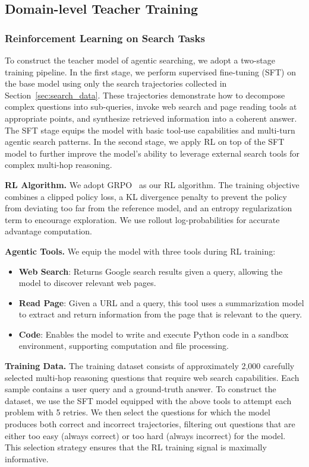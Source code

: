 \documentclass{llmxive}
\begin{document}
\subsection{Domain-level Teacher Training}
\label{sec:domain-level}

\subsubsection{Reinforcement Learning on Search Tasks}
To construct the teacher model of agentic searching, we adopt a two-stage training pipeline. In the first stage, we perform supervised fine-tuning (SFT) on the base model using only the search trajectories collected in Section~\ref{sec:search_data}. These trajectories demonstrate how to decompose complex questions into sub-queries, invoke web search and page reading tools at appropriate points, and synthesize retrieved information into a coherent answer. The SFT stage equips the model with basic tool-use capabilities and multi-turn agentic search patterns. In the second stage, we apply RL on top of the SFT model to further improve the model's ability to leverage external search tools for complex multi-hop reasoning.

\textbf{RL Algorithm.} We adopt GRPO~\citep{shao2024deepseekmath} as our RL algorithm. The training objective combines a clipped policy loss, a KL divergence penalty to prevent the policy from deviating too far from the reference model, and an entropy regularization term to encourage exploration. We use rollout log-probabilities for accurate advantage computation.

\textbf{Agentic Tools.} We equip the model with three tools during RL training:
\begin{itemize}
    \item \textbf{Web Search}: Returns Google search results given a query, allowing the model to discover relevant web pages.
    \item \textbf{Read Page}: Given a URL and a query, this tool uses a summarization model to extract and return information from the page that is relevant to the query.
    \item \textbf{Code}: Enables the model to write and execute Python code in a sandbox environment, supporting computation and file processing.
\end{itemize}

\textbf{Training Data.} The training dataset consists of approximately 2,000 carefully selected multi-hop reasoning questions that require web search capabilities. Each sample contains a user query and a ground-truth answer. To construct the dataset, we use the SFT model equipped with the above tools to attempt each problem with 5 retries. We then select the questions for which the model produces both correct and incorrect trajectories, filtering out questions that are either too easy (always correct) or too hard (always incorrect) for the model. This selection strategy ensures that the RL training signal is maximally informative.
\end{document}
